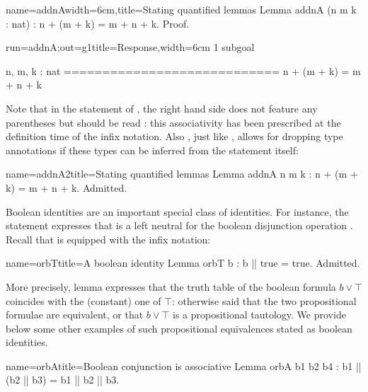 \begin{coq}{name=addnA}{width=6cm,title=Stating quantified lemmas}
Lemma addnA (n m k : nat) :
  n + (m + k) = m + n + k.
Proof.
\end{coq}
\begin{coqout}{run=addnA;out=g1}{title=Response,width=6cm}
1 subgoal

 n, m, k : nat
 ============================
  n + (m + k) = m + n + k
\end{coqout}

Note that in the statement of , the right hand side does not
feature any parentheses but should be read : this
associativity has been prescribed at the definition time of the infix
\C{+} notation. Also
, just like , allows for
dropping type annotations if these types can be inferred from the
statement itself:

\begin{coq}{name=addnA2}{title=Stating quantified lemmas}
Lemma addnA n m k : n + (m + k) = m + n + k.
Admitted.
\end{coq}


Boolean identities are an important special class of identities. For
instance, the~ statement expresses that  is a left
neutral for the boolean disjunction operation . Recall that
 is equipped with the \C{||} infix notation:

\begin{coq}{name=orbT}{title=A boolean identity}
Lemma orbT b : b || true = true.
Admitted.
\end{coq}


More precisely, lemma 
expresses that the truth table of the boolean formula $b \vee \top$
coincides with the (constant) one of $\top$: otherwise said that the
two propositional formulae are equivalent, or that $b \vee \top$ is a
propositional tautology. We provide below some other examples of such
propositional equivalences stated as boolean identities.

\begin{coq}{name=orbA}{title=Boolean conjunction is associative}
Lemma orbA b1 b2 b4 :
  b1 || (b2 || b3) = b1 || b2 || b3.
\end{coq}

